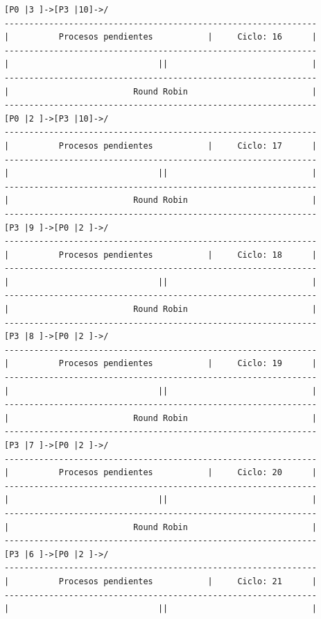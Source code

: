 \documentclass[12pt]{article}
\begin{document}
\begin{verbatim}
[P0 |3 ]->[P3 |10]->/
---------------------------------------------------------------
|          Procesos pendientes           |     Ciclo: 16      |
---------------------------------------------------------------
|                              ||                             |
---------------------------------------------------------------
|                         Round Robin                         |
---------------------------------------------------------------
[P0 |2 ]->[P3 |10]->/
---------------------------------------------------------------
|          Procesos pendientes           |     Ciclo: 17      |
---------------------------------------------------------------
|                              ||                             |
---------------------------------------------------------------
|                         Round Robin                         |
---------------------------------------------------------------
[P3 |9 ]->[P0 |2 ]->/
---------------------------------------------------------------
|          Procesos pendientes           |     Ciclo: 18      |
---------------------------------------------------------------
|                              ||                             |
---------------------------------------------------------------
|                         Round Robin                         |
---------------------------------------------------------------
[P3 |8 ]->[P0 |2 ]->/
---------------------------------------------------------------
|          Procesos pendientes           |     Ciclo: 19      |
---------------------------------------------------------------
|                              ||                             |
---------------------------------------------------------------
|                         Round Robin                         |
---------------------------------------------------------------
[P3 |7 ]->[P0 |2 ]->/
---------------------------------------------------------------
|          Procesos pendientes           |     Ciclo: 20      |
---------------------------------------------------------------
|                              ||                             |
---------------------------------------------------------------
|                         Round Robin                         |
---------------------------------------------------------------
[P3 |6 ]->[P0 |2 ]->/
---------------------------------------------------------------
|          Procesos pendientes           |     Ciclo: 21      |
---------------------------------------------------------------
|                              ||                             |

\end{verbatim}
\end{document}
